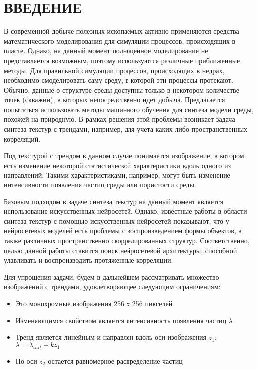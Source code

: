 \clearpage
\section*{\hfil ВВЕДЕНИЕ \hfil}
	В современной добыче полезных ископаемых активно применяются средства математического моделирования для симуляции процессов, происходящих в пласте. Однако, на данный момент полноценное моделирование не представляется возможным, поэтому используются различные приближенные методы. Для правильной симуляции процессов, происходящих в недрах, необходимо смоделировать саму среду, в которой эти процессы протекают. Обычно, данные о структуре среды доступны только в некотором количестве точек (скважин), в которых непосредственно идет добыча. Предлагается попытаться использовать методы машинного обучения для синтеза модели среды, похожей на природную. В рамках решения этой проблемы возникает задача синтеза текстур с трендами, например, для учета каких-либо пространственных корреляций. 
	
	Под текстурой с трендом в данном случае понимается изображение, в котором есть изменение некоторой статистической характеристики вдоль одного из направлений. Такими характеристиками, например, могут быть изменение интенсивности появления частиц среды или пористости среды.
	
	Базовым подходом в задаче синтеза текстур на данный момент является использование искусственных нейросетей. Однако, известные работы в области синтеза текстур с помощью искусственных нейросетей \cite{texture-synthesis-using-CNN, texture-networks} показывают, что у нейросетевых моделей есть проблемы с воспроизведением формы объектов, а также различных пространственно скоррелированных структур. Соответственно, целью данной работы ставится поиск нейросетевой архитектуры, способной улавливать и воспроизводить протяженные корреляции.
	
	Для упрощения задачи, будем в дальнейшем рассматривать множество изображений с трендами, удовлетворяющее следующим ограничениям:
	
	\begin{itemize}
		\item Это монохромные изображения 256 x 256 пикселей
		\item Изменяющимся свойством является интенсивность появления частиц $\lambda$
		\item Тренд является линейным и направлен вдоль оси изображения $z_1$: 
		$ \lambda = \lambda_{init} + k z_1 $
		\item По оси $z_2$ остается равномерное распределение частиц
	\end{itemize}
	
